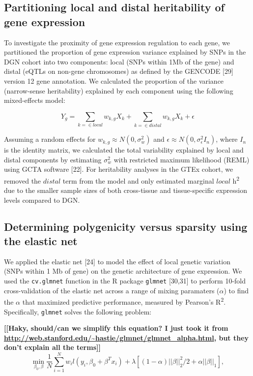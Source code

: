 \documentclass[]{article}
\begin{document}
\subsection{Partitioning local and distal heritability of gene
expression}\label{partitioning-local-and-distal-heritability-of-gene-expression}

To investigate the proximity of gene expression regulation to each gene,
we partitioned the proportion of gene expression variance explained by
SNPs in the DGN cohort into two components: local (SNPs within 1Mb of
the gene) and distal (eQTLs on non-gene chromosomes) as defined by the
GENCODE {[}29{]} version 12 gene annotation. We calculated the
proportion of the variance (narrow-sense heritability) explained by each
component using the following mixed-effects model:

\[ Y_g = \sum_{k = \in local}w_{k,g} X_k + \sum_{k = \in distal}w_{k,g} X_k + \epsilon \]

Assuming a random effects for \(w_{k,g} \approx N(0, \sigma^2_w)\) and
\(\epsilon \approx N(0, \sigma^2_{\epsilon} I_n)\), where \(I_n\) is the
identity matrix, we calculated the total variability explained by local
and distal components by estimating \(\sigma^2_w\) with restricted
maximum likelihood (REML) using GCTA software {[}22{]}. For heritability
analyses in the GTEx cohort, we removed the \(distal\) term from the
model and only estimated marginal \(local\) h\textsuperscript{2} due to
the smaller sample sizes of both cross-tissue and tissue-specific
expression levels compared to DGN.

\subsection{Determining polygenicity versus sparsity using the elastic
net}\label{determining-polygenicity-versus-sparsity-using-the-elastic-net}

We applied the elastic net {[}24{]} to model the effect of local genetic
variation (SNPs within 1 Mb of gene) on the genetic architecture of gene
expression. We used the \texttt{cv.glmnet} function in the R package
\texttt{glmnet} {[}30,31{]} to perform 10-fold cross-validation of the
elastic net across a range of mixing paramaters (\(\alpha\)) to find the
\(\alpha\) that maximized predictive performance, measured by Pearson's
R\textsuperscript{2}. Specifically, \texttt{glmnet} solves the following
problem:

\textbf{{[}{[}Haky, should/can we simplify this equation? I just took it
from \url{http://web.stanford.edu/~hastie/glmnet/glmnet_alpha.html}, but
they don't explain all the terms{]}{]}}
{\[\min_{\beta_0,\beta} \frac{1}{N} \sum_{i=1}^{N} w_i l(y_i,\beta_0+\beta^T x_i) + \lambda\left[(1-\alpha)||\beta||_2^2/2 + \alpha ||\beta||_1\right], \]}
\end{document}
